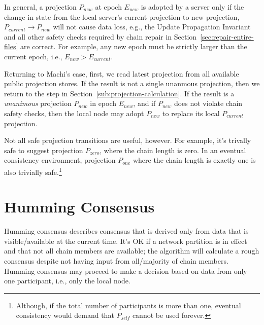 \documentclass[preprint,10pt]{sigplanconf}
\begin{document}
In general, a projection $P_{new}$ at epoch $E_{new}$ is adopted by a
server only if
the change in state from the local server's current projection to new
projection, $P_{current} \rightarrow P_{new}$ will not cause data loss,
e.g., the Update Propagation Invariant and all other safety checks
required by chain repair in Section~\ref{sec:repair-entire-files}
are correct. For example, any new epoch must be strictly larger than
the current epoch, i.e., $E_{new} > E_{current}$.

Returning to Machi's case, first, we read latest projection from all
available public projection stores.  If the result is not a single
unanmous projection, then we return to the step in
Section~\ref{sub:projection-calculation}.  If the result is a {\em
  unanimous} projection $P_{new}$ in epoch $E_{new}$, and if $P_{new}$
does not violate chain safety checks, then the local node may adopt
$P_{new}$ to replace its local $P_{current}$ projection.

Not all safe projection transitions are useful, however.  For example,
it's trivally safe to suggest projection $P_{zero}$, where the chain
length is zero.  In an eventual consistency environment, projection
$P_{one}$ where the chain length is exactly one is also trivially
safe.\footnote{Although, if the total number of participants is more
  than one, eventual consistency would demand that $P_{self}$ cannot
  be used forever.}

\section{Humming Consensus}
\label{sec:humming-consensus}

Humming consensus describes consensus that is derived only from data
that is visible/available at the current time.  It's OK if a network
partition is in effect and that not all chain members are available;
the algorithm will calculate a rough consensus despite not
having input from all/majority of chain members.  Humming consensus
may proceed to make a decision based on data from only one
participant, i.e., only the local node.
\end{document}
